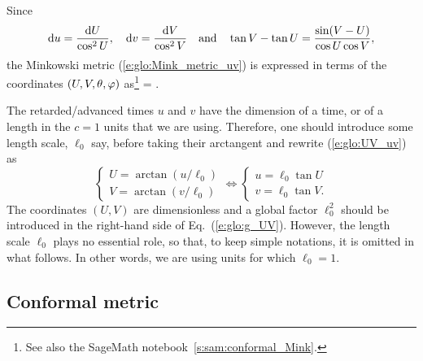 Since
\[
    \mathrm{d} u = \frac{\mathrm{d} U}{\cos^2 U}, \quad \mathrm{d} v = \frac{\mathrm{d} V}{\cos^2 V}
    \quad\mbox{and}\quad
    \tan V - \tan U = \frac{\sin(V-U)}{\cos U \cos V},
\]
the Minkowski metric (\ref{e:glo:Mink_metric_uv})
is expressed in terms of the coordinates $(U,V,\theta,\varphi)$
as\footnote{See also the SageMath notebook~\ref{s:sam:conformal_Mink}.}
\be \label{e:glo:g_UV}
     = 
     .
\ee

\begin{remark}
The retarded/advanced times $u$ and $v$ have the dimension of a time, or of a
length in the $c=1$ units that we are using. Therefore, one should introduce
some length scale, $\ell_0$ say, before taking their arctangent and rewrite
(\ref{e:glo:UV_uv}) as
\[
    \left\{ \begin{array}{l}
    U = \arctan (u/\ell_0) \\
    V = \arctan (v/\ell_0)
    \end{array} \right.
    \iff
   \left\{ \begin{array}{l}
    u = \ell_0 \tan U \\
    v = \ell_0 \tan V .
    \end{array} \right.
\]
The coordinates $(U,V)$ are dimensionless and a global factor $\ell_0^2$ should be
introduced in the right-hand side of Eq.~(\ref{e:glo:g_UV}).
However, the length scale $\ell_0$ plays no essential role,
so that, to keep simple notations,
it is omitted in what follows. In other words, we are using units for
which $\ell_0=1$.
\end{remark}

\subsection{Conformal metric} \label{s:glo:conf_metric}

